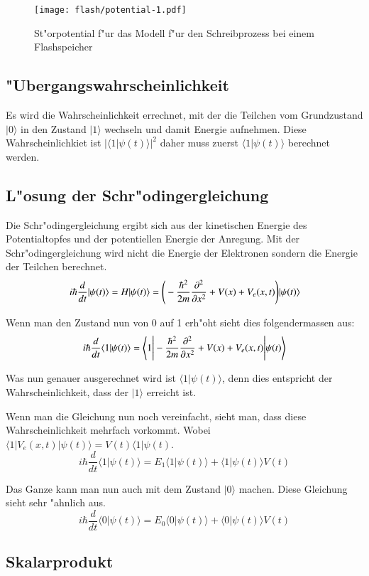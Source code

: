 \begin{refsection}
\begin{figure}
\centering
\texttt{[image: flash/potential-1.pdf]}
\caption{St"orpotential f"ur das Modell f"ur den Schreibprozess bei
einem Flashspeicher
\label{flash:Anregung}}
\end{figure}

\subsection{"Ubergangswahrscheinlichkeit}
Es wird die Wahrscheinlichkeit errechnet, mit der die Teilchen
vom Grundzustand $|0\rangle$ in den Zustand $|1\rangle$ wechseln
und damit Energie aufnehmen. 
Diese Wahrscheinlichkiet ist $\vert\langle1|\psi(t)\rangle\vert^2$
daher muss zuerst $\langle1|\psi(t)\rangle$ berechnet werden.

\subsection{L"osung der Schr"odingergleichung}
Die Schr"odingergleichung ergibt sich aus der kinetischen Energie des
Potentialtopfes und der potentiellen Energie der Anregung.
Mit der Schr"odingergleichung wird nicht die Energie der Elektronen
sondern die Energie der Teilchen berechnet.
\[
i\hbar\frac{d}{dt}|\psi(t)\rangle = H|\psi(t)\rangle = \Bigg{(}-\frac{\hbar^2}{2m} \frac{\partial^2}{\partial x^2}+V(x)+V_{e}(x,t)\Bigg{)}|\psi(t)\rangle
\]

Wenn man den Zustand nun von 0 auf 1 erh"oht sieht dies folgendermassen aus:
\[
i\hbar\frac{d}{dt}\langle1|\psi(t)\rangle = \Bigg{\langle}1\Bigg{|}-\frac{\hbar^2}{2m} \frac{\partial^2}{\partial x^2}+V(x)+V_{e}(x,t)\Bigg{|}\psi(t)\Bigg{\rangle}
\]

Was nun genauer ausgerechnet wird ist $\langle1|\psi(t)\rangle$, denn
dies entspricht der Wahrscheinlichkeit, dass der $|1\rangle$ erreicht ist.

Wenn man die Gleichung nun noch vereinfacht, sieht man, dass diese
Wahrscheinlichkeit mehrfach vorkommt.
Wobei $\langle1|V_e(x,t)|\psi(t)\rangle = V(t)\langle1|\psi(t)$.  
\[
i\hbar\frac{d}{dt}\langle1|\psi(t)\rangle = E_{1}\langle1|\psi(t)\rangle+\langle1|\psi(t)\rangle V(t)
\]

Das Ganze kann man nun auch mit dem Zustand $|0\rangle$ machen. Diese
Gleichung sieht sehr "ahnlich aus.
\[
i\hbar\frac{d}{dt}\langle0|\psi(t)\rangle = E_{0}\langle0|\psi(t)\rangle+\langle0|\psi(t)\rangle V(t)
\]

\subsection{Skalarprodukt}


\end{refsection}
